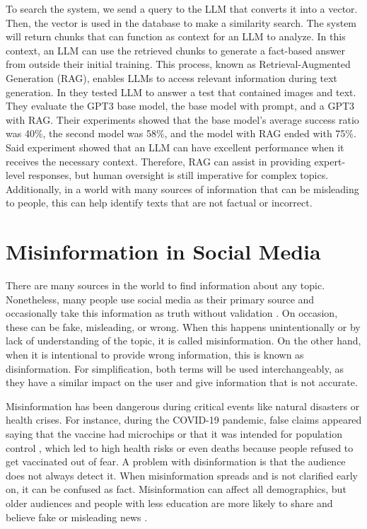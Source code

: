 To search the system, we send a query to the LLM that converts it into a vector. Then, the vector is used in the database to make a similarity search. The system will return chunks that can function as context for an LLM to
analyze. In this context, an LLM can use the retrieved chunks to generate a fact-based answer from outside their initial training. This process, known as Retrieval-Augmented Generation (RAG), enables LLMs to access relevant
information during text generation. In \cite{10683437} they tested LLM to answer a test that contained images and text. They evaluate the GPT3 base model, the base model with prompt, and a GPT3 with RAG. Their experiments
showed that the base model's average success ratio was 40\%, the second model was 58\%, and the model with RAG ended with 75\%. Said experiment showed that an LLM can have excellent performance when it receives the necessary context.
Therefore, RAG can assist in providing expert-level responses, but human oversight is still imperative for complex topics. Additionally, in a world with many sources of information that can be misleading to people, this can help identify
texts that are not factual or incorrect. 


\section{Misinformation in Social Media}
There are many sources in the world to find information about any topic. Nonetheless, many people use social media as their primary source \cite{socialmedias} and occasionally take this information as truth without
validation \cite{social_fact}. On occasion, these can be fake, misleading, or wrong. When this happens unintentionally or by lack of understanding of the topic, it is called misinformation. On the other hand,
when it is intentional to provide wrong information, this is known as disinformation. For simplification, both terms will be used interchangeably, as they have a similar impact on the user and give information that is not accurate.

Misinformation has been dangerous during critical events like natural disasters or health crises. For instance, during the COVID-19 pandemic, false claims appeared saying that the vaccine had
microchips or that it was intended for population control \cite{article_vaccine}, which led to high health risks or even deaths \cite{article} because people refused to get vaccinated out of fear. A problem with disinformation is that the audience
does not always detect it. When misinformation spreads and is not clarified early on, it can be confused as fact. Misinformation can affect all demographics, but older audiences and people with less education are more
likely to share and believe fake or misleading news  \cite{encyclopedia3040099}. 

